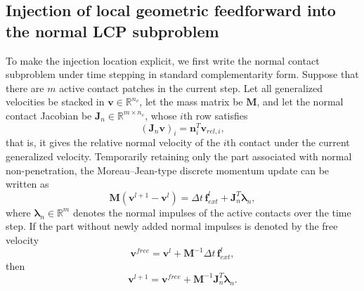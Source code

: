 \subsection{Injection of local geometric feedforward into the normal LCP subproblem}
To make the injection location explicit, we first write the normal contact subproblem under time stepping in standard complementarity form. Suppose that there are $m$ active contact patches in the current step. Let all generalized velocities be stacked in $\mathbf{v}\in\mathbb{R}^{n_v}$, let the mass matrix be $\mathbf{M}$, and let the normal contact Jacobian be $\mathbf{J}_n\in\mathbb{R}^{m\times n_v}$, whose $i$th row satisfies
\begin{equation}
    (\mathbf{J}_n \mathbf{v})_i = \mathbf{n}_i^T \mathbf{v}_{rel,i},
\end{equation}
that is, it gives the relative normal velocity of the $i$th contact under the current generalized velocity. Temporarily retaining only the part associated with normal non-penetration, the Moreau--Jean-type discrete momentum update can be written as
\begin{equation}
    \mathbf{M}(\mathbf{v}^{l+1} - \mathbf{v}^{l}) = \Delta t\,\mathbf{f}^{l}_{ext} + \mathbf{J}_n^T \boldsymbol{\lambda}_n,
\end{equation}
where $\boldsymbol{\lambda}_n\in\mathbb{R}^{m}$ denotes the normal impulses of the active contacts over the time step. If the part without newly added normal impulses is denoted by the free velocity
\begin{equation}
    \mathbf{v}^{free} = \mathbf{v}^{l} + \mathbf{M}^{-1}\Delta t\,\mathbf{f}^{l}_{ext},
\end{equation}
then
\begin{equation}
    \mathbf{v}^{l+1} = \mathbf{v}^{free} + \mathbf{M}^{-1}\mathbf{J}_n^T \boldsymbol{\lambda}_n.
\end{equation}

